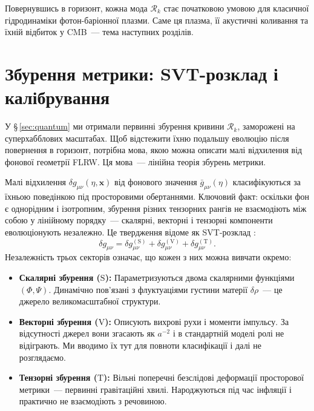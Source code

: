\documentclass[12pt, a4paper]{article}
\begin{document}
Повернувшись в горизонт, кожна мода $\mathcal{R}_k$ стає
початковою умовою для класичної гідродинаміки фотон-баріонної
плазми. Саме ця плазма, її акустичні коливання та їхній відбиток
у CMB~--- тема наступних розділів.


\section{Збурення метрики: SVT-розклад і калібрування}
\label{sec:metric}

У §\,\ref{sec:quantum} ми отримали первинні збурення кривини
$\mathcal{R}_k$, заморожені на суперхабблових масштабах.
Щоб відстежити їхню подальшу еволюцію після повернення в
горизонт, потрібна мова, якою можна описати малі відхилення
від фонової геометрії FLRW. Ця мова~--- лінійна теорія збурень
метрики.

Малі відхилення $\delta g_{\mu\nu}(\eta, \mathbf{x})$ від
фонового значення $\bar{g}_{\mu\nu}(\eta)$ класифікуються за
їхньою поведінкою під просторовими обертаннями. Ключовий факт:
оскільки фон є однорідним і ізотропним, збурення різних
тензорних рангів не взаємодіють між собою у лінійному порядку~---
скалярні, векторні і тензорні компоненти еволюціонують
незалежно. Це твердження відоме як SVT-розклад
\cite{stewart_walker_1974}:
\begin{equation}\label{eq:svt_decomposition}
  \delta g_{\mu\nu}
    = \delta g_{\mu\nu}^{(\mathrm{S})}
    + \delta g_{\mu\nu}^{(\mathrm{V})}
    + \delta g_{\mu\nu}^{(\mathrm{T})}.
\end{equation}
Незалежність трьох секторів означає, що кожен з них можна
вивчати окремо:
\begin{itemize}
  \item \textbf{Скалярні збурення ($\mathrm{S}$):}
        Параметризуються двома скалярними функціями
        $(\Phi, \Psi)$. Динамічно пов'язані з флуктуаціями
        густини матерії $\delta\rho$~--- це джерело
        великомасштабної структури.
  \item \textbf{Векторні збурення ($\mathrm{V}$):}
        Описують вихрові рухи і моменти імпульсу. За
        відсутності джерел вони згасають як $a^{-2}$
        \cite{mukhanov_2005} і в стандартній моделі ролі не
        відіграють. Ми вводимо їх тут для повноти
        класифікації і далі не розглядаємо.
  \item \textbf{Тензорні збурення ($\mathrm{T}$):}
        Вільні поперечні безслідові деформації просторової
        метрики~--- первинні гравітаційні хвилі. Народжуються
        під час інфляції і практично не взаємодіють з
        речовиною.
\end{itemize}
\end{document}
